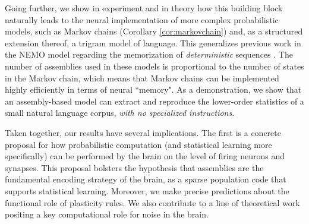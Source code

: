 \documentclass{article}
\theoremstyle{remark}
\newcommand{\1}{\mathbbm{1}}
\begin{document}
Going further, we show in experiment and in theory how this building block naturally leads to the neural implementation of more complex probabilistic models, such as Markov chains (Corollary \ref{cor:markovchain}) and, as a structured extension thereof, a trigram model of language. This generalizes previous work in the NEMO model regarding the memorization of \emph{deterministic} sequences \cite{dabagia2024computation}. The number of assemblies used in these models is proportional to the number of states in the Markov chain, which means that Markov chains can be implemented highly efficiently in terms of neural ``memory". As a demonstration, we show that an assembly-based model can extract and reproduce the lower-order statistics of a small natural language corpus, {\em with no specialized instructions}.

Taken together, our results have several implications. The first is a concrete proposal for how probabilistic computation (and statistical learning more specifically) can be performed by the brain on the level of firing neurons and synapses. This proposal bolsters the hypothesis that assemblies are the fundamental encoding strategy of the brain, as a sparse population code that supports statistical learning. Moreover, we make precise predictions about the functional role of plasticity rules. We also contribute to a line of theoretical work \cite{hoyer2002interpreting, gershman2009perceptual, buesing2011neural} positing a key computational role for noise in the brain.




\end{document}
